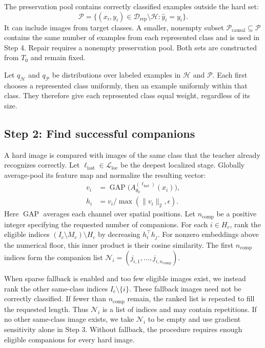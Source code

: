 \documentclass[review,number,sort&compress]{elsarticle}
\theoremstyle{definition}
\begin{document}
The preservation pool contains correctly classified examples
outside the hard set:
\begin{equation}
\label{eq:repair-preservation-set}
\mathcal{P}=
\{(x_i,y_i)\in\mathcal{D}_{\mathrm{rep}}\setminus\mathcal{H}:
  \widehat y_i=y_i\}.
\end{equation}
It can include images from target classes. A smaller,
nonempty subset $\mathcal{P}_{\mathrm{causal}}\subseteq\mathcal{P}$
contains the same number of examples from each represented
class and is used in Step 4. Repair requires a nonempty
preservation pool. Both sets are constructed from $T_0$
and remain fixed.

Let $q_{\mathcal H}$ and $q_{\mathcal P}$ be distributions
over labeled examples in $\mathcal H$ and $\mathcal P$. Each first
chooses a represented class uniformly, then an example
uniformly within that class. They therefore give each
represented class equal weight, regardless of its size.

\subsection{Step 2: Find successful companions}

A hard image is compared with images of the same class that
the teacher already recognizes correctly. Let
$\ell_{\mathrm{last}}\in\mathcal{L}_{\mathrm{loc}}$ be the
deepest localized stage. Globally average-pool its feature
map and normalize the resulting vector:
\begin{equation}
\label{eq:repair-embedding}
\begin{aligned}
v_i&=\operatorname{GAP}
 \bigl(A_{\theta_0}^{(\ell_{\mathrm{last}})}(x_i)\bigr),\\
h_i&=v_i/\max(\|v_i\|_2,\epsilon).
\end{aligned}
\end{equation}
Here $\operatorname{GAP}$ averages each channel over spatial
positions. Let $n_{\mathrm{comp}}$ be a positive integer
specifying the requested number of companions.
For each $i\in H_c$, rank the eligible indices
$(I_c\setminus M_c)\setminus H_c$ by decreasing
$h_i^\top h_j$. For nonzero embeddings above the numerical
floor, this inner product is their cosine similarity.
The first $n_{\mathrm{comp}}$ indices form the companion
list $\mathcal{N}_i=(j_{i,1},\ldots,j_{i,n_{\mathrm{comp}}})$.

When sparse fallback is enabled and too few eligible
images exist, we instead rank the other same-class indices
$I_c\setminus\{i\}$. These fallback images need not be
correctly classified. If fewer than $n_{\mathrm{comp}}$
remain, the ranked list is repeated to fill the requested
length. Thus $\mathcal{N}_i$ is a list of indices and may
contain repetitions. If no other same-class image exists,
we take $\mathcal{N}_i$ to be empty and use gradient
sensitivity alone in Step 3. Without fallback, the procedure
requires enough eligible companions for every hard image.
\end{document}
